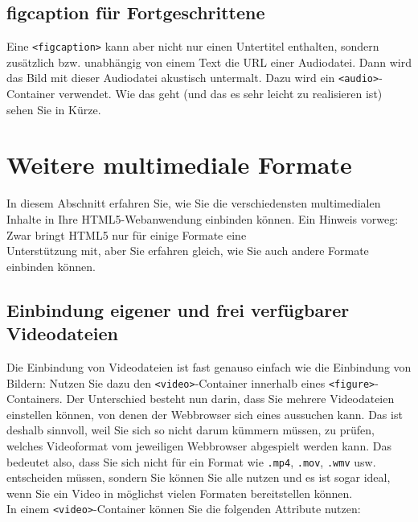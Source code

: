 \subsection{figcaption für Fortgeschrittene}

Eine \verb|<figcaption>| kann aber nicht nur einen Untertitel enthalten, sondern zusätzlich bzw. unabhängig von einem Text die URL einer Audiodatei. Dann wird das Bild mit dieser Audiodatei akustisch untermalt. Dazu wird ein \verb|<audio>|-Container verwendet. Wie das geht (und das es sehr leicht zu realisieren ist) sehen Sie in Kürze.

\section{Weitere multimediale Formate}

In diesem Abschnitt erfahren Sie, wie Sie die verschiedensten multimedialen Inhalte in Ihre HTML5-Webanwendung einbinden können. Ein Hinweis vorweg: Zwar bringt HTML5 nur für einige Formate eine \\Unterstützung mit, aber Sie erfahren gleich, wie Sie auch andere Formate einbinden können.

\subsection{Einbindung eigener und frei verfügbarer Videodateien}

Die Einbindung von Videodateien ist fast genauso einfach wie die Einbindung von Bildern: Nutzen Sie dazu den \verb|<video>|-Container innerhalb eines \verb|<figure>|-Containers. Der Unterschied besteht nun darin, dass Sie mehrere Videodateien einstellen können, von denen der Webbrowser sich eines aussuchen kann. Das ist deshalb sinnvoll, weil Sie sich so nicht darum kümmern müssen, zu prüfen, welches Videoformat vom jeweiligen Webbrowser abgespielt werden kann. Das bedeutet also, dass Sie sich nicht für ein Format wie \verb|.mp4|, \verb|.mov|, \verb|.wmv| usw. entscheiden müssen, sondern Sie können Sie alle nutzen und es ist sogar ideal, wenn Sie ein Video in möglichst vielen Formaten bereitstellen können.\\

In einem \verb|<video>|-Container können Sie die folgenden Attribute nutzen:

